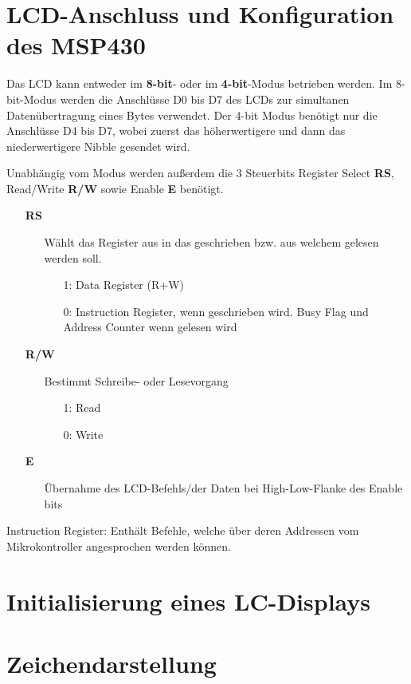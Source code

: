 \documentclass[a4paper, 12pt]{article}
\begin{document}
\section{LCD-Anschluss und Konfiguration des MSP430}
Das LCD kann entweder im \textbf{8-bit}- oder im \textbf{4-bit}-Modus 
betrieben werden. Im 8-bit-Modus werden die Anschlüsse D0 bis D7 des LCDs zur
simultanen Datenübertragung eines Bytes verwendet. Der 4-bit Modus benötigt nur die Anschlüsse D4 bis
D7, wobei zuerst das höherwertigere und dann das niederwertigere Nibble gesendet
wird.

Unabhängig vom Modus werden außerdem die 3 Steuerbits Register Select
\textbf{RS}, Read/Write \textbf{R/W}
sowie Enable \textbf{E} benötigt.

\begin{enumerate}
\item[] \textbf{RS}
  \begin{enumerate}
    \item[] Wählt das Register aus in das geschrieben bzw. aus welchem gelesen
      werden soll.
      \begin{enumerate}
      \item[1:] Data Register (R+W)
        \item[0:] Instruction Register, wenn geschrieben wird. Busy Flag und
          Address Counter wenn
          gelesen wird
      \end{enumerate}
  \end{enumerate}

\item[] \textbf{R/W}
  \begin{enumerate}
    \item[] Bestimmt Schreibe- oder Lesevorgang
      \begin{enumerate}
       \item[1:] Read
       \item[0:] Write
      \end{enumerate}
  \end{enumerate}

\item[] \textbf{E}
  \begin{enumerate}
    \item[] Übernahme des LCD-Befehls/der Daten bei High-Low-Flanke des Enable bits 
       \end{enumerate}
\end{enumerate}

Instruction Register: Enthält Befehle, welche über deren Addressen vom
Mikrokontroller angesprochen werden können.

\section{Initialisierung eines LC-Displays}
\section{Zeichendarstellung}
  
 
\end{document}
